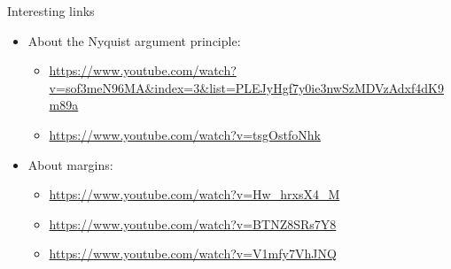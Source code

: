 \begin{frame}{Interesting links}
\begin{itemize}
\item About the Nyquist argument principle:
\begin{itemize}
\item \url{https://www.youtube.com/watch?v=sof3meN96MA&index=3&list=PLEJyHgf7y0ie3nwSzMDVzAdxf4dK9m89a}
\item \url{https://www.youtube.com/watch?v=tsgOstfoNhk
}
\end{itemize}
\item About margins:
\begin{itemize}
\item \url{https://www.youtube.com/watch?v=Hw_hrxsX4_M
}
\item \url{https://www.youtube.com/watch?v=BTNZ8SRs7Y8
}
\item \url{https://www.youtube.com/watch?v=V1mfy7VhJNQ
}
\end{itemize}
\end{itemize}
\end {frame}

